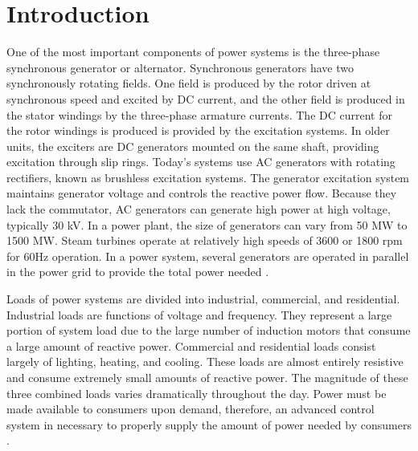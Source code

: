 \section{Introduction}
One of the most important components of power systems is the three-phase synchronous generator or alternator. Synchronous generators have two synchronously rotating fields. One field is produced by the rotor driven at synchronous speed and excited by DC current, and the other field is produced in the stator windings by the three-phase armature currents. The DC current for the rotor windings is produced is provided by the excitation systems. In older units, the exciters are DC generators mounted on the same shaft, providing excitation through slip rings. Today's systems use AC generators with rotating rectifiers, known as brushless excitation systems. The generator excitation system maintains generator voltage and controls the reactive power flow. Because they lack the commutator, AC generators can generate high power at high voltage, typically 30 kV. In a power plant, the size of generators can vary from 50 MW to 1500 MW. Steam turbines operate at relatively high speeds of 3600 or 1800 rpm for 60Hz operation. In a power system, several generators are operated in parallel in the power grid to provide the total power needed \cite{analysis}.

Loads of power systems are divided into industrial, commercial, and residential. Industrial loads are functions of voltage and frequency. They represent a large portion of system load due to the large number of induction motors that consume a large amount of reactive power. Commercial and residential loads consist largely of lighting, heating, and cooling. These loads are almost entirely resistive and consume extremely small amounts of reactive power. The magnitude of these three combined loads varies dramatically throughout the day. Power must be made available to consumers upon demand, therefore, an advanced control system in necessary to properly supply the amount of power needed by consumers \cite{analysis}.


